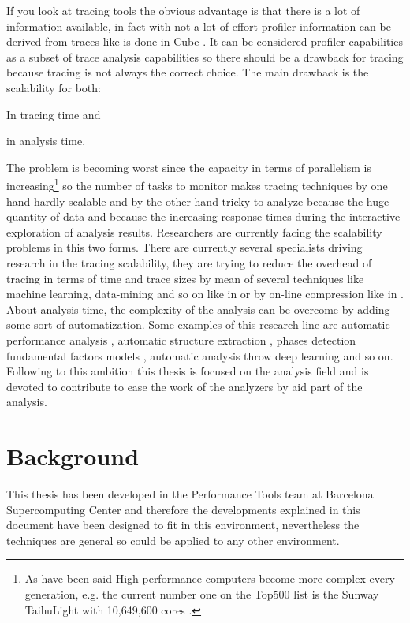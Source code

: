 If you look
at tracing tools the obvious advantage is that there is a lot of information
available, in fact with not a lot of effort profiler information can be derived
from traces like is done in Cube \cite{saviankou2015cube}. It can be considered
profiler capabilities as a subset of trace analysis capabilities so there should
be a drawback for tracing because tracing is not always the correct choice. The
main drawback is the scalability for both:
\begin{enumerate*}[label=\roman*)]
  \item In tracing time and
  \item in analysis time.
\end{enumerate*}
The problem is becoming worst since the capacity in 
terms of parallelism is increasing\footnote{As have been said High performance 
computers become more complex every generation, e.g. the current number one on 
the Top500 list is the Sunway TaihuLight with 10,649,600 cores\cite{top500_2017} 
.} so the number of tasks to monitor makes 
tracing techniques by one hand hardly scalable and by the other hand tricky to analyze
because the huge quantity of data and because the increasing response times
during the interactive exploration of analysis results. Researchers are currently 
facing the scalability problems in this two forms. 
There are currently several specialists driving research in the tracing
scalability, they are trying to reduce 
the overhead of tracing in terms of time and trace sizes by mean of several 
techniques like machine learning, data-mining and so on like in 
\cite{llort2015intelligent} or by on-line compression like in
\cite{noeth2009scalatrace}. About analysis time, the complexity of the analysis 
can be overcome by adding some sort of automatization. Some examples of this 
research line are automatic performance analysis \cite{wolf2003automatic}, 
automatic structure extraction \cite{casas2007automatic}, phases detection 
\cite{gonzalez2013application} fundamental factors models \cite{casas2008aass}, 
automatic analysis throw deep learning \cite{simon:2017:perfdp} and so on.
Following to this ambition this thesis is focused on the analysis field and is 
devoted to contribute to ease the work of the analyzers by aid part of the analysis. 

\section{Background}\label{s:pt_evironment}

This thesis has been developed in the Performance Tools team at Barcelona
Supercomputing Center and therefore the developments explained in this
document have been designed to fit in this environment, nevertheless the
techniques are general so could be applied to any other environment.

